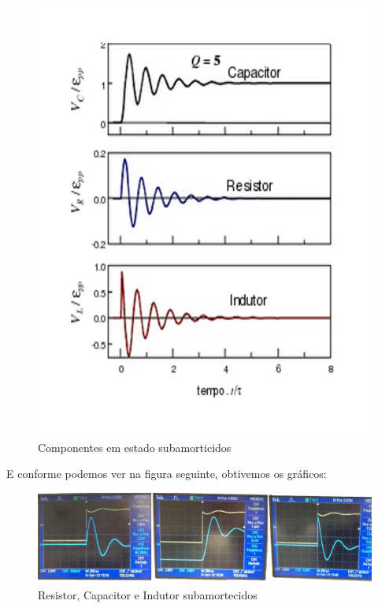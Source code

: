 \documentclass[12pt,letterpaper]{article}
\begin{document}
\begin{figure}[!htb]
  \centering
  \label{subteo}
  \includegraphics[scale=0.30]{img/subamortecido.jpg}
  \caption{Componentes em estado subamorticidos}
\end{figure}
E conforme podemos ver na figura seguinte, obtivemos os gráficos:
\begin{figure}[!htb]
  \centering
  \label{mysub}
  \includegraphics[scale=0.18]{img/mysub.jpg}
  \caption{Resistor, Capacitor e Indutor subamortecidos}
\end{figure}
\\
\\
\\
\\
\\
\\
\end{document}
